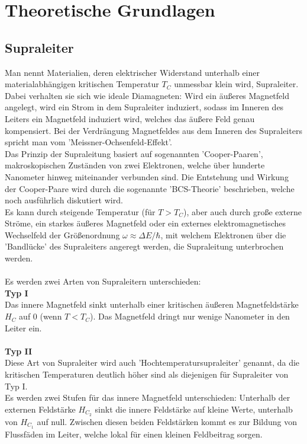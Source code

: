 \section{Theoretische Grundlagen}
\subsection{Supraleiter}
Man nennt Materialien, deren elektrischer Widerstand unterhalb einer materialabhängigen kritischen Temperatur $T_{C}$ unmessbar klein wird, Supraleiter. Dabei verhalten sie sich wie ideale Diamagneten: Wird ein äußeres Magnetfeld angelegt, wird ein Strom in dem Supraleiter induziert, sodass im Inneren des Leiters ein Magnetfeld induziert wird, welches das äußere Feld genau kompensiert. Bei der Verdrängung Magnetfeldes aus dem Inneren des Supraleiters spricht man vom 'Meissner-Ochsenfeld-Effekt'.\\
Das Prinzip der Supraleitung basiert auf sogenannten 'Cooper-Paaren', makroskopischen Zuständen von zwei Elektronen, welche über hunderte Nanometer hinweg miteinander verbunden sind. Die Entstehung und Wirkung der Cooper-Paare wird durch die sogenannte 'BCS-Theorie' beschrieben, welche noch ausführlich diskutiert wird.\\
Es kann durch steigende Temperatur (für $T>T_{C}$), aber auch durch große externe Ströme, ein starkes äußeres Magnetfeld oder ein externes elektromagnetisches Wechselfeld der Größenordnung $\omega\approx \Delta E/\hbar$, mit welchem Elektronen über die 'Bandlücke' des Supraleiters angeregt werden, die Supraleitung unterbrochen werden.\\
~\\
Es werden zwei Arten von Supraleitern unterschieden:\\
\textbf{Typ I}\\
Das innere Magnetfeld sinkt unterhalb einer kritischen äußeren Magnetfeldstärke $H_{C}$ auf 0 (wenn $T<T_{C}$). Das Magnetfeld dringt  nur wenige Nanometer in den Leiter ein.\\
~\\
\textbf{Typ II}\\
Diese Art von Supraleiter wird auch 'Hochtemperatursupraleiter' genannt, da die kritischen Temperaturen deutlich höher sind als diejenigen für Supraleiter von Typ I. \\
Es werden zwei Stufen für das innere Magnetfeld unterschieden:  Unterhalb der externen Feldstärke $H_{C_{2}}$ sinkt die innere Feldstärke auf kleine Werte, unterhalb von $H_{C_{1}}$ auf null. Zwischen diesen beiden Feldstärken kommt es zur Bildung von Flussfäden im Leiter, welche lokal für einen kleinen Feldbeitrag sorgen. 
